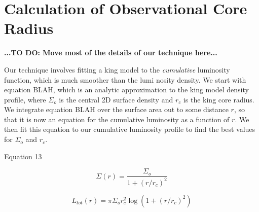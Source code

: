 \documentclass[12pt,preprint]{aastex}
\begin{document}
\clearpage
\appendix
\section{Calculation of Observational Core Radius}
\textbf{...TO DO: Move most of the details of our technique here...}

Our technique involves fitting a king model to the \emph{cumulative} luminosity function, which is much smoother than the lumi nosity density.  We start with equation BLAH, which is an analytic approximation to the king model density profile, where $\Sigma_o$ is the central 2D surface density and $r_c$ is the king core radius. We integrate equation BLAH over the surface area out to some distance $r$, so that it is now an equation for the cumulative luminosity as a function of $r$. We then fit this equation to our cumulative luminosity profile to find the best values for $\Sigma_o$ and $r_c$.  

\citep{King1962} Equation 13

\begin{equation}
\Sigma(r) = \frac{\Sigma_o}{1+{(r/r_c)}^2}
\label{eq:SigmaKing}
\end{equation}

\begin{equation}
L_{tot}(r) = \pi \Sigma_o r_c^2 \log \left( 1 + (r/r_c)^2  \right)
\label{eq:IntegralSigmaKing}
\end{equation}
\end{document}
